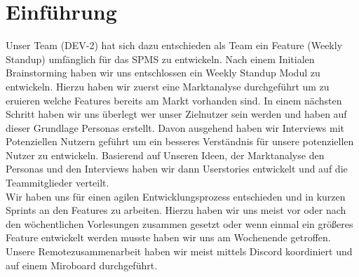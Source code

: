 \chapter{Einführung}

Unser Team (DEV-2) hat sich dazu entschieden als Team ein Feature (Weekly Standup) umfänglich für das \ac{SPMS} zu entwickeln. Nach einem Initialen Brainstorming haben wir uns entschlossen ein Weekly Standup Modul zu entwickeln. Hierzu haben wir zuerst eine Marktanalyse durchgeführt um zu eruieren welche Features bereits am Markt vorhanden sind. In einem nächsten Schritt haben wir uns überlegt wer unser Zielnutzer sein werden und haben auf dieser Grundlage Personas erstellt. Davon ausgehend haben wir Interviews mit Potenziellen Nutzern geführt um ein besseres Verständnis für unsere potenziellen Nutzer zu entwickeln. Basierend auf Unseren Ideen, der Marktanalyse den Personas und den Interviews haben wir dann Userstories entwickelt und auf die Teammitglieder verteilt. \\
Wir haben uns für einen agilen  Entwicklungsprozess entschieden und in kurzen Sprints an den Features zu arbeiten. Hierzu haben wir uns meist vor oder nach den wöchentlichen Vorlesungen zusammen gesetzt oder wenn einmal ein größeres Feature entwickelt werden musste haben wir uns am Wochenende getroffen.\\
Unsere Remotezusammenarbeit haben wir meist mittels Discord\cite{discord2022} koordiniert und auf einem Miroboard\cite{miro2022} durchgeführt. 